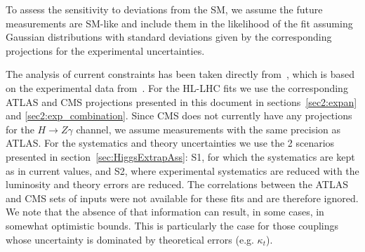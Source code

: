 To assess the sensitivity to deviations from the SM, we assume the future measurements are SM-like and include them in the likelihood of the fit assuming Gaussian distributions with standard deviations given by the corresponding projections for the experimental uncertainties. 

The analysis of current constraints has been taken directly from~\cite{deBlas:2018tjm}, which is based on the experimental data from~\cite{Aaltonen:2013ipa,Abazov:2013gmz,Chatrchyan:2013iaa,Chatrchyan:2013vaa,Chatrchyan:2013zna,Aad:2014eha,Aad:2014eva,Aad:2014xzb,ATLAS:2014aga,Chatrchyan:2014nva,Khachatryan:2014ira,Khachatryan:2014jba,Khachatryan:2014qaa,Aad:2015gba,Aad:2015gra,Aad:2015ona,Aad:2015vsa,ATLAS:2016gld,CMS:2016mmc,Khachatryan:2016vau,Aaboud:2017jvq,Aaboud:2017ojs,Aaboud:2017rss,Aaboud:2017uhw,Aaboud:2017vzb,Aaboud:2017xsd,CMS:2017rli,CMS-PAS-HIG-17-007,CMS-PAS-HIG-17-019,Sirunyan:2017elk,Sirunyan:2017exp,Sirunyan:2017khh,Aaboud:2018xdt,ATLAS-CONF-2018-004,Sirunyan:2018egh,Sirunyan:2018mvw,Sirunyan:2018shy,Sirunyan:2018ygk}. 
For the HL-LHC fits we use the corresponding ATLAS and CMS projections presented in this document in sections~\ref{sec2:expan} and \ref{sec2:exp_combination}.  
Since CMS does not currently have any projections
for the $H\to Z\gamma$ channel, we assume measurements with
the same precision as ATLAS.
For the systematics and theory uncertainties we use the 2 scenarios presented in section~\ref{sec:HiggsExtrapAss}: S1, for which the systematics are kept as in current values, and S2, where experimental systematics are reduced with the luminosity and theory errors are reduced.
%
The correlations between the ATLAS and CMS sets of inputs were not available for these fits and are therefore ignored. We note that the absence of that information can result, in some cases, in somewhat optimistic bounds. This is particularly the case for those couplings whose uncertainty is dominated by theoretical errors (e.g. $\kappa_t$).

